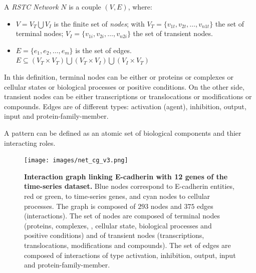 \begin{definition} \label{def:RSTCDef}
A \emph{RSTC Network} $N$ is a couple $(V,E)$, where:
\begin{itemize}
\item $V =V_{T} \bigcup V_{I} $ is the finite set of \emph{nodes};
 with 
  $V_{T} = \{v_{1t},v_{2t}, \dots ,v_{n1t} \} $ the set of terminal nodes;
  $V_{I} = \{v_{1i},v_{2i}, \dots ,v_{n2i} \} $ the set of transient nodes.
\item $E = \{e_{1},e_{2}, \dots, e_{m} \}$ is the set of edges. $ E \subseteq (V_{T} \times V_{T}) \bigcup (V_{T} \times V_{I}) 
\bigcup (V_{I} \times V_{T})$
\end{itemize}
\end{definition}

In this definition, terminal nodes can be either  or proteins or complexes or cellular states or biological processes or positive conditions. 
On the other side, transient nodes can be either transcriptions or translocations or modifications or compounds. Edges are of different types:
activation (agent), inhibition, output, input and protein-family-member.


\begin{definition}[Pattern] \label{def:pattern}

A pattern can be defined as an atomic set of biological components and thier interacting roles. 

\end{definition}


\begin{figure}[!p]
 \centering
 \texttt{[image: images/net\_cg\_v3.png]}
\caption{{\bf  Interaction graph linking E-cadherin with 12 genes of the time-series dataset.} Blue nodes correspond to E-cadherin entities, red or green, to time-series genes, 
and cyan nodes to cellular processes. The graph is composed of $293$ nodes and $375$ edges (interactions).
The set of nodes are composed of terminal nodes (proteins, complexes, , cellular state, biological processes and positive conditions) and of transient
nodes (transcriptions, translocations, modifications and compounds). The set of edges are composed of interactions of type activation, inhibition, output, 
input and protein-family-member.} 
 \label{fig:network}
\end{figure}

